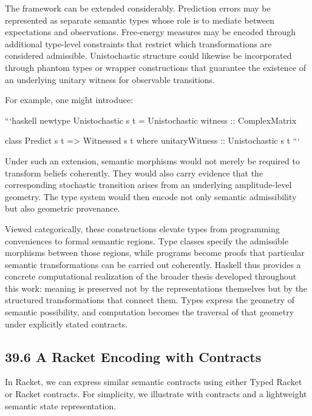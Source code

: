 \documentclass[12pt,letterpaper]{article}
\theoremstyle{remark}
\begin{document}
The framework can be extended considerably. Prediction errors may be represented as separate semantic types whose role is to mediate between expectations and observations. Free-energy measures may be encoded through additional type-level constraints that restrict which transformations are considered admissible. Unistochastic structure could likewise be incorporated through phantom types or wrapper constructions that guarantee the existence of an underlying unitary witness for observable transitions.

For example, one might introduce:

```haskell
newtype Unistochastic s t =
  Unistochastic { witness :: ComplexMatrix }

class Predict s t =>
      Witnessed s t where
  unitaryWitness ::
    Unistochastic s t
```

Under such an extension, semantic morphisms would not merely be required to transform beliefs coherently. They would also carry evidence that the corresponding stochastic transition arises from an underlying amplitude-level geometry. The type system would then encode not only semantic admissibility but also geometric provenance.

Viewed categorically, these constructions elevate types from programming conveniences to formal semantic regions. Type classes specify the admissible morphisms between those regions, while programs become proofs that particular semantic transformations can be carried out coherently. Haskell thus provides a concrete computational realization of the broader thesis developed throughout this work: meaning is preserved not by the representations themselves but by the structured transformations that connect them. Types express the geometry of semantic possibility, and computation becomes the traversal of that geometry under explicitly stated contracts.


\subsection{39.6 A Racket Encoding with Contracts}

In Racket, we can express similar semantic contracts using either Typed Racket or Racket contracts. For simplicity, we illustrate with contracts and a lightweight semantic state representation.
\end{document}
